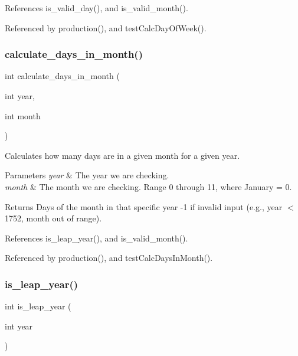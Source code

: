 References is\+\_\+valid\+\_\+day(), and is\+\_\+valid\+\_\+month().



Referenced by production(), and test\+Calc\+Day\+Of\+Week().

\mbox{\label{production_8h_a0b9793f3dff701e2a9903c8539328ad4}} 
\subsubsection{calculate\+\_\+days\+\_\+in\+\_\+month()}
{\footnotesize\ttfamily int calculate\+\_\+days\+\_\+in\+\_\+month (\begin{DoxyParamCaption}\item[{int}]{year,  }\item[{int}]{month }\end{DoxyParamCaption})}

Calculates how many days are in a given month for a given year. 
\begin{DoxyParams}{Parameters}
{\em year} & The year we are checking. \\
\hline
{\em month} & The month we are checking. Range 0 through 11, where January = 0. \\
\hline
\end{DoxyParams}
\begin{DoxyReturn}{Returns}
Days of the month in that specific year -\/1 if invalid input (e.\+g., year $<$ 1752, month out of range). 
\end{DoxyReturn}


References is\+\_\+leap\+\_\+year(), and is\+\_\+valid\+\_\+month().



Referenced by production(), and test\+Calc\+Days\+In\+Month().

\mbox{\label{production_8h_a89b1fdc34c29bc50b397019f5e32f7af}} 
\subsubsection{is\+\_\+leap\+\_\+year()}
{\footnotesize\ttfamily int is\+\_\+leap\+\_\+year (\begin{DoxyParamCaption}\item[{int}]{year }\end{DoxyParamCaption})}

